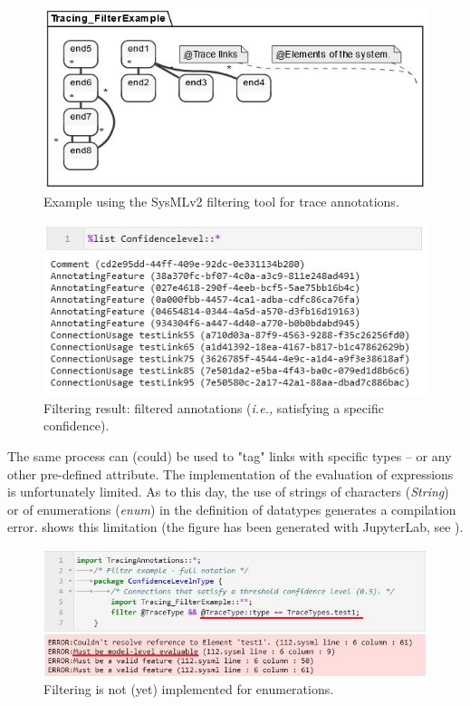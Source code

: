 

\begin{figure}[ht]     
	\centering
	\includegraphics[width=.9\linewidth]{images/viz_filterexample.JPG}
	\caption{Example using the SysMLv2 filtering tool for trace annotations.}
	\label{fig:vizfilter}
\end{figure} 

\begin{figure}[ht]     
	\centering
	\includegraphics[width=.75\linewidth]{images/viz_filterexample_res.JPG}
	\caption{Filtering result: filtered annotations (\textit{i.e.,} satisfying a specific confidence).}
	\label{fig:vizfilterres}
\end{figure} 



The same process can (could) be used to "tag" links with specific types -- or any other pre-defined attribute. The implementation of the evaluation of expressions is unfortunately limited. As to this day, the use of strings of characters (\textit{String}) or of enumerations (\textit{enum}) in the definition of datatypes generates a compilation error.  shows this limitation (the figure has been generated with JupyterLab, see ).

\begin{figure}[ht]     
	\centering
	\includegraphics[width=.9\linewidth]{images/viz_filterexample_err.JPG}
	\caption{Filtering is not (yet) implemented for enumerations.}
	\label{fig:vizfiltererr}
\end{figure} 
